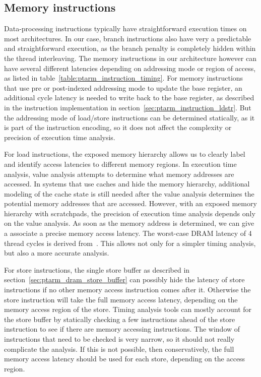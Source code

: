 \subsection{Memory instructions}
Data-processing instructions typically have straightforward execution times on most architectures.
In our case, branch instructions also have very a predictable and straightforward execution, as the branch penalty is completely hidden within the thread interleaving.
The memory instructions in our architecture however can have several different latencies depending on addressing mode or region of access, as listed in table~\ref{table:ptarm_instruction_timing}.
For memory instructions that use pre or post-indexed addressing mode to update the base register, an additional cycle latency is needed to write back to the base register, as described in the instruction implementation in section~\ref{sec:ptarm_instruction_ldstr}.
But the addressing mode of load/store instructions can be determined statically, as it is part of the instruction encoding, so it does not affect the complexity or precision of execution time analysis. 

For load instructions, the exposed memory hierarchy allows us to clearly label and identify access latencies to different memory regions.
In execution time analysis, value analysis attempts to determine what memory addresses are accessed.     
In systems that use caches and hide the memory hierarchy, additional modeling of the cache state is still needed after the value analysis determines the potential memory addresses that are accessed.
However, with an exposed memory hierarchy with scratchpads, the precision of execution time analysis depends only on the value analysis. 
As soon as the memory address is determined, we can give a associate a precise memory access latency.
The worst-case DRAM latency of 4 thread cycles is derived from~\cite{ReinekeLiuPatelKimLee11_PRETDRAMControllerBankPrivatizationForPredictability}. 
This allows not only for a simpler timing analysis, but also a more accurate analysis.

For store instructions, the single store buffer as described in section~\ref{sec:ptarm_dram_store_buffer} can possibly hide the latency of store instructions if no other memory access instruction comes after it. 
Otherwise the store instruction will take the full memory access latency, depending on the memory access region of the store.
Timing analysis tools can mostly account for the store buffer by statically checking a few instructions ahead of the store instruction to see if there are memory accessing instructions.
The window of instructions that need to be checked is very narrow, so it should not really complicate the analysis.
If this is not possible, then conservatively, the full memory access latency should be used for each store, depending on the access region.

